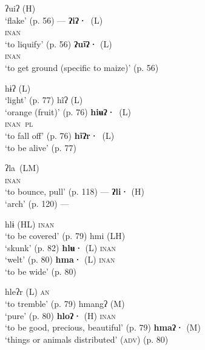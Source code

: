\documentclass[output=paper]{langscibook}
\begin{document}
\ea
{}
     {ʔuiʔ (H)\\
          \glt ‘flake’ (p. 56)
     }
     {---}
     {\gll \textbf{ʔiʔ·}~(L)\\
          \textsc{inan} \\
          \glt ‘to liquify’ (p. 56)
     }
     {\textbf{ʔuĩʔ·} (L)\\
     \textsc{inan}\\
               \glt ‘to get ground (specific to maize)’ (p. 56)
     }
\z

\ea
{}
     {hɨʔ (L)\\
          \glt ‘light’ (p. 77)
     }
     {hĩʔ (L) \\
          \glt ‘orange (fruit)’ (p. 76)
     }
     {\gll \textbf{hiʉʔ·}~(L)\\
          \textsc{inan}~\textsc{pl}\\
          \glt ‘to fall off’ (p. 76)
     }
     {\textbf{hĩʔr·}~(L) \\
          \glt ‘to be alive’ (p. 77)
     }
\z

\newpage
\ea
{}
     {ʔla~(LM)\\
     \textsc{inan} \\
          \glt ‘to bounce, pull’ (p. 118)
     }
     {---}
     {\textbf{ʔli·} (H) \\
          \glt ‘arch’ (p. 120)
     }
     {---}
\z


\ea
     {hlɨ (HL) \textsc{inan} \\
          \glt ‘to be covered’ (p. 79)
     }
     {hmi (LH)\\
          \glt ‘skunk’ (p. 82)
     }
     {\textbf{hlʉ·} (L) \textsc{inan}\\
          \glt ‘welt’ (p. 80)
     }
     {\textbf{hma·} (L) \textsc{inan}\\
          \glt ‘to be wide’ (p. 80)
     }
\z



\ea
{}
     {hleʔr (L) \textsc{an} \\
          \glt ‘to tremble’ (p. 79)
     }
     {hmangʔ (M)\\
          \glt ‘pure’ (p. 80)
     }
     {\textbf{hloʔ·} (H) \textsc{inan}\\
          \glt ‘to be good, precious, beautiful’ (p. 79)
     }
     {\textbf{hmaʔ·} (M)\\
          \glt ‘things or animals distributed’ (\textsc{adv}) (p. 80)
     }
\z
\end{document}
